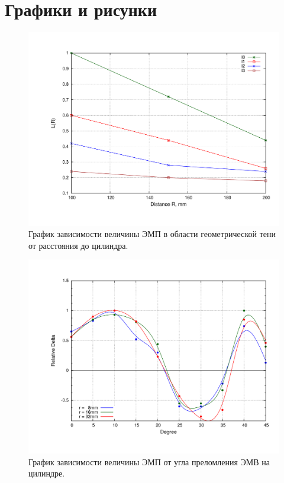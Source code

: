 \documentclass[12pt,a4paper,oneside, reqno]{amsart}
\begin{document}
\section{Графики и рисунки}
\begin{figure}[h!b]
    \centering
    \includegraphics[width = \textwidth]{plot1.pdf}
    \vspace{-30pt}
    \caption{График зависимости величины ЭМП в области геометрической тени от расстояния до цилиндра.}
    \label{fig:plot1}
\end{figure}

\begin{figure}
    \centering
    \includegraphics[width = \textwidth]{plot2.pdf}
    \vspace{-30pt}
    \caption{График зависимости величины ЭМП от угла преломления ЭМВ на цилиндре.}
    \label{fig:plot2}
\end{figure}
\end{document}
